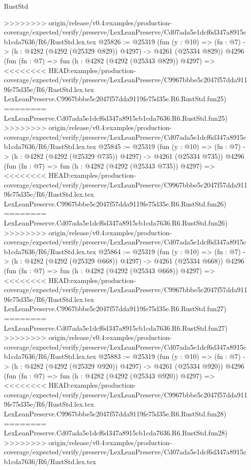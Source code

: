 \begin{lexlean}{RustStd}
\begin{coremodule}
{\begin{coremodule}
{{{{{{{{{{{{{{{{{{{{{{{{{{{{{{{{{{{>>>>>>>> origin/release/v0.4:examples/production-coverage/expected/verify/preserve/LexLeanPreserve/Cd07ada5e1dcf6d347a8915cb1cda7636/R6/RustStd.lex.tex
@25826 := @25319
    (fun (y : @10) => (fn : @7) -> (h : @4282 (@4292 (@25329 @829)) @4297) -> @4261 (@25334 @829))
    @4296
    (fun (fn : @7) =>
    fun (h : @4282 (@4292 (@25343 @829)) @4297) =>
<<<<<<<< HEAD:examples/production-coverage/expected/verify/preserve/LexLeanPreserve/C9967bbbe5c2047f57dda9119fe75d35e/R6/RustStd.lex.tex
    LexLeanPreserve.C9967bbbe5c2047f57dda9119fe75d35e.R6.RustStd.fun25)
========
    LexLeanPreserve.Cd07ada5e1dcf6d347a8915cb1cda7636.R6.RustStd.fun25)
>>>>>>>> origin/release/v0.4:examples/production-coverage/expected/verify/preserve/LexLeanPreserve/Cd07ada5e1dcf6d347a8915cb1cda7636/R6/RustStd.lex.tex
@25845 := @25319
    (fun (y : @10) => (fn : @7) -> (h : @4282 (@4292 (@25329 @735)) @4297) -> @4261 (@25334 @735))
    @4296
    (fun (fn : @7) =>
    fun (h : @4282 (@4292 (@25343 @735)) @4297) =>
<<<<<<<< HEAD:examples/production-coverage/expected/verify/preserve/LexLeanPreserve/C9967bbbe5c2047f57dda9119fe75d35e/R6/RustStd.lex.tex
    LexLeanPreserve.C9967bbbe5c2047f57dda9119fe75d35e.R6.RustStd.fun26)
========
    LexLeanPreserve.Cd07ada5e1dcf6d347a8915cb1cda7636.R6.RustStd.fun26)
>>>>>>>> origin/release/v0.4:examples/production-coverage/expected/verify/preserve/LexLeanPreserve/Cd07ada5e1dcf6d347a8915cb1cda7636/R6/RustStd.lex.tex
@25864 := @25319
    (fun (y : @10) => (fn : @7) -> (h : @4282 (@4292 (@25329 @668)) @4297) -> @4261 (@25334 @668))
    @4296
    (fun (fn : @7) =>
    fun (h : @4282 (@4292 (@25343 @668)) @4297) =>
<<<<<<<< HEAD:examples/production-coverage/expected/verify/preserve/LexLeanPreserve/C9967bbbe5c2047f57dda9119fe75d35e/R6/RustStd.lex.tex
    LexLeanPreserve.C9967bbbe5c2047f57dda9119fe75d35e.R6.RustStd.fun27)
========
    LexLeanPreserve.Cd07ada5e1dcf6d347a8915cb1cda7636.R6.RustStd.fun27)
>>>>>>>> origin/release/v0.4:examples/production-coverage/expected/verify/preserve/LexLeanPreserve/Cd07ada5e1dcf6d347a8915cb1cda7636/R6/RustStd.lex.tex
@25883 := @25319
    (fun (y : @10) => (fn : @7) -> (h : @4282 (@4292 (@25329 @920)) @4297) -> @4261 (@25334 @920))
    @4296
    (fun (fn : @7) =>
    fun (h : @4282 (@4292 (@25343 @920)) @4297) =>
<<<<<<<< HEAD:examples/production-coverage/expected/verify/preserve/LexLeanPreserve/C9967bbbe5c2047f57dda9119fe75d35e/R6/RustStd.lex.tex
    LexLeanPreserve.C9967bbbe5c2047f57dda9119fe75d35e.R6.RustStd.fun28)
========
    LexLeanPreserve.Cd07ada5e1dcf6d347a8915cb1cda7636.R6.RustStd.fun28)
>>>>>>>> origin/release/v0.4:examples/production-coverage/expected/verify/preserve/LexLeanPreserve/Cd07ada5e1dcf6d347a8915cb1cda7636/R6/RustStd.lex.tex
}}}}}}}}}}}}}}}}}}}}}}}}}}}}}}}}}}}
\end{coremodule}}
\end{coremodule}
\end{lexlean}
